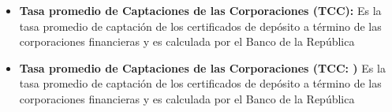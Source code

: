 \begin{itemize}
	      
	\item  {\textbf{Tasa promedio de Captaciones de las Corporaciones (TCC): }}
	      Es la tasa promedio de captación de los certificados de depósito a término de las corporaciones financieras y es calculada por el Banco de la República\\
	      
	\item {\textbf{Tasa promedio de Captaciones de las Corporaciones (TCC: )}}
	      Es la tasa promedio de captación de los certificados de depósito a término de las corporaciones financieras y es calculada por el Banco de la República\\
	      
\end{itemize}
